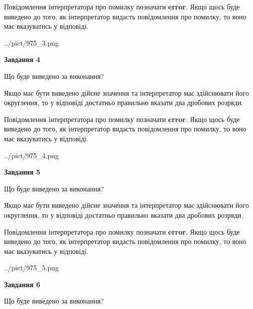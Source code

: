 \documentclass[12pt, ukrainian]{article}
\begin{document}
{\begin {Large}
Повідомлення інтерпретатора про помилку позначати \textbf{error}.
Якщо щось буде виведено до того, як інтерпретатор видасть повідомлення про помилку, 
то воно має вказуватись у відповіді. \par

\begin{center}
	{../pict/975_3.png}
\end{center}
\newpage

{\begin {center}\textbf{Завдання 4}\end {center}}\par
Що буде виведено за виконання? \par

Якщо має бути виведено дійсне значення та інтерпретатор має здійснювати його округлення, 
то у відповіді достатньо правильно вказати два дробових розряди.

Повідомлення інтерпретатора про помилку позначати \textbf{error}.
Якщо щось буде виведено до того, як інтерпретатор видасть повідомлення про помилку, 
то воно має вказуватись у відповіді. \par

\begin{center}
	{../pict/975_4.png}
\end{center}
\newpage

{\begin {center}\textbf{Завдання 5}\end {center}}\par
Що буде виведено за виконання? \par

Якщо має бути виведено дійсне значення та інтерпретатор має здійснювати його округлення, 
то у відповіді достатньо правильно вказати два дробових розряди.

Повідомлення інтерпретатора про помилку позначати \textbf{error}.
Якщо щось буде виведено до того, як інтерпретатор видасть повідомлення про помилку, 
то воно має вказуватись у відповіді. \par

\begin{center}
	{../pict/975_5.png}
\end{center}
\newpage

{\begin {center}\textbf{Завдання 6}\end {center}}\par
Що буде виведено за виконання? \par


\end{Large}}
\end{document}
